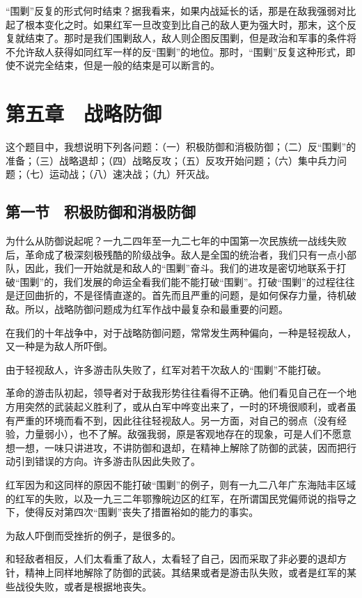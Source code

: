 “围剿”反复的形式何时结束？据我看来，如果内战延长的话，那是在敌我强弱对比起了根本变化之时。如果红军一旦改变到比自己的敌人更为强大时，那末，这个反复就结束了。那时是我们围剿敌人，敌人则企图反围剿，但是政治和军事的条件将不允许敌人获得如同红军一样的反“围剿”的地位。那时，“围剿”反复这种形式，即使不说完全结束，但是一般的结束是可以断言的。

\section{第五章　战略防御}

这个题目中，我想说明下列各问题：（一）积极防御和消极防御；（二）反“围剿”的准备；（三）战略退却；（四）战略反攻；（五）反攻开始问题；（六）集中兵力问题；（七）运动战；（八）速决战；（九）歼灭战。

\subsection{第一节　积极防御和消极防御}

为什么从防御说起呢？一九二四年至一九二七年的中国第一次民族统一战线失败后，革命成了极深刻极残酷的阶级战争。敌人是全国的统治者，我们只有一点小部队，因此，我们一开始就是和敌人的“围剿”奋斗。我们的进攻是密切地联系于打破“围剿”的，我们发展的命运全看我们能不能打破“围剿”。打破“围剿”的过程往往是迂回曲折的，不是径情直遂的。首先而且严重的问题，是如何保存力量，待机破敌。所以，战略防御问题成为红军作战中最复杂和最重要的问题。

在我们的十年战争中，对于战略防御问题，常常发生两种偏向，一种是轻视敌人，又一种是为敌人所吓倒。

由于轻视敌人，许多游击队失败了，红军对若干次敌人的“围剿”不能打破。

革命的游击队初起，领导者对于敌我形势往往看得不正确。他们看见自己在一个地方用突然的武装起义胜利了，或从白军中哗变出来了，一时的环境很顺利，或者虽有严重的环境而看不到，因此往往轻视敌人。另一方面，对自己的弱点（没有经验，力量弱小），也不了解。敌强我弱，原是客观地存在的现象，可是人们不愿意想一想，一味只讲进攻，不讲防御和退却，在精神上解除了防御的武装，因而把行动引到错误的方向。许多游击队因此失败了。

红军因为和这同样的原因不能打破“围剿”的例子，则有一九二八年广东海陆丰区域的红军的失败，以及一九三二年鄂豫皖边区的红军，在所谓国民党偏师说的指导之下，使得反对第四次“围剿”丧失了措置裕如的能力的事实。

为敌人吓倒而受挫折的例子，是很多的。

和轻敌者相反，人们太看重了敌人，太看轻了自己，因而采取了非必要的退却方针，精神上同样地解除了防御的武装。其结果或者是游击队失败，或者是红军的某些战役失败，或者是根据地丧失。

